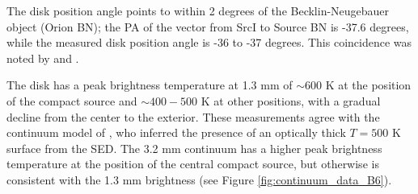 \documentclass[twocolumn]{aastex61}
\newcommand{\sourcei}{SrcI\xspace}
\begin{document}



The disk position angle points to within 2 degrees of the Becklin-Neugebauer
object (Orion BN); the PA of the vector from \sourcei to Source BN is -37.6
degrees, while the measured disk position angle is -36 to -37 degrees.
This coincidence was noted by \citet{Bally2011a} and \citet{Goddi2011b}.


The disk has a peak brightness temperature at 1.3 mm of $\sim600$ K at the
position of the compact source and $\sim400-500$ K at other positions, with a
gradual decline from the center to the exterior.  These measurements agree with
the continuum model of \citet{Plambeck2016a}, who inferred the presence of an
optically thick $T=500$ K surface from the SED.  The 3.2 mm continuum has a
higher peak brightness temperature at the position of the central compact
source, but otherwise is consistent with the 1.3 mm brightness (see Figure
\ref{fig:continuum_data_B6}).
\end{document}
